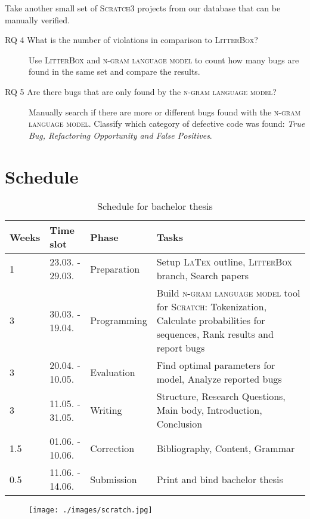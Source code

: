 \documentclass[
    numbers=noenddot,
    parskip=half-,
    fontsize=12pt,
    paper=a4,
    oneside,
    titlepage,
    bibliography=totoc,
    chapterprefix=false,
]{scrbook}
\newcommand{\latex}{\textsc{LaTex}}
\newcommand{\ngram}{\textsc{n-gram language model}}
\newcommand{\litterbox}{\textsc{LitterBox}}
\newcommand{\scratch}{\textsc{Scratch}}
\begin{document}
	Take another small set of \scratch{3} projects from our database that can be manually verified.
	
    \begin{description}
        \item[RQ 4 What is the number of violations in comparison to \litterbox{}?] 
        Use \litterbox{} and \ngram{} to count how many bugs are found in the same set and compare the results.
        \item[RQ 5 Are there bugs that are only found by the \ngram{}?] 
        Manually search if there are more or different bugs found with the \ngram{}. Classify which category of defective code was found: \textit{True Bug, Refactoring Opportunity and False Positives}.
    \end{description}
 
 
 	\chapter{Schedule}\label{ch:schedule}
 	
 	\begin{table}[ht]
 		\label{tab:schedule}
 		\caption{Schedule for bachelor thesis}
 		\begin{tabular}{p{1cm}p{3cm}p{3cm}p{8cm}}
 			Weeks & Time slot & Phase & Tasks \\
 			\hline
 			1 & 23.03. - 29.03. & Preparation & Setup \latex{} outline, \litterbox{} branch, Search papers \\
 			3 & 30.03. - 19.04. & Programming & Build \ngram{} tool for \scratch{}: Tokenization, Calculate probabilities for sequences, Rank results and report bugs\\
 			3 & 20.04. - 10.05. & Evaluation & Find optimal parameters for model, Analyze reported bugs\\
 			3 & 11.05. - 31.05. & Writing & Structure, Research Questions, Main body, Introduction, Conclusion \\
 			1.5 & 01.06. - 10.06. & Correction & Bibliography, Content, Grammar \\
 			0.5 & 11.06. - 14.06. & Submission & Print and bind bachelor thesis\\
 			\hline
 		\end{tabular}
 	\end{table}
 
 	\begin{figure}
 		\centering
 		\texttt{[image: ./images/scratch.jpg]}
 	\end{figure}


    \backmatter

    \printbibliography
    
\end{document}
